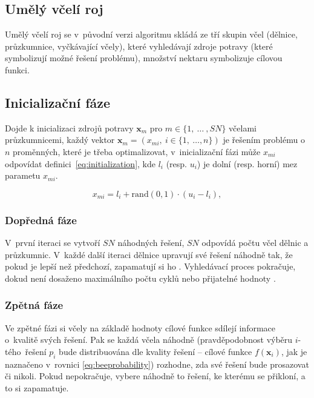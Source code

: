 \documentclass[twoside]{ctuthesis}
\begin{document}
\subsection{Umělý včelí roj}
Umělý včelí roj se v~původní verzi algoritmu skládá ze tří skupin včel (dělnice, průzkumnice, vyčkávající včely), které vyhledávají zdroje potravy (které symbolizují možné řešení problému), množství nektaru symbolizuje cílovou funkci. \cite{anuar2016modified}

\subsection{Inicializační fáze}
Dojde k inicializaci zdrojů potravy $\boldsymbol{x}_m$ pro $m \in \{1,~\ldots~, SN\}$ včelami průzkumnicemi, každý vektor $\boldsymbol{x}_m = (x_{mi},~i \in \{1,~\ldots, n \})$ je řešením problému o $n$ proměnných, které je třeba optimalizovat, v~inicializační fázi může $x_{mi}$ odpovídat definici~\ref{eq:initialization}, kde $l_i$ (resp. $u_i$) je dolní (resp. horní) mez parametu $x_{mi}$. \cite{karaboga2010artificial}

\begin{equation}
	\label{eq:initialization}
	x_{mi} = l_i + \mbox{rand}(0,1) \cdot (u_i - l_i),
\end{equation}



\subsubsection{Dopředná fáze}
V~první iteraci se vytvoří $SN$ náhodných řešení, $SN$ odpovídá počtu včel dělnic a průzkumnic. V~každé další iteraci dělnice upravují své řešení náhodně tak, že pokud je lepší než předchozí, zapamatují si ho \cite{anuar2016modified}. Vyhledávací proces pokračuje, dokud není dosaženo maximálního počtu cyklů nebo přijatelné hodnoty \cite{banharnsakun2011best}.

\subsubsection{Zpětná fáze}
Ve zpětné fázi si včely na základě hodnoty cílové funkce sdílejí informace o~kvalitě svých řešení. Pak se každá včela náhodně (pravděpodobnost výběru $i$-tého~řešení $p_i$ bude distribuována dle kvality řešení -- cílové funkce $f(\boldsymbol{x}_i)$, jak je naznačeno v~rovnici \ref{eq:beeprobability}) rozhodne, zda své řešení bude prosazovat či nikoli. Pokud nepokračuje, vybere náhodně to řešení, ke kterému se přikloní, a to si zapamatuje. \cite{teodorovic2009bee}
\end{document}
